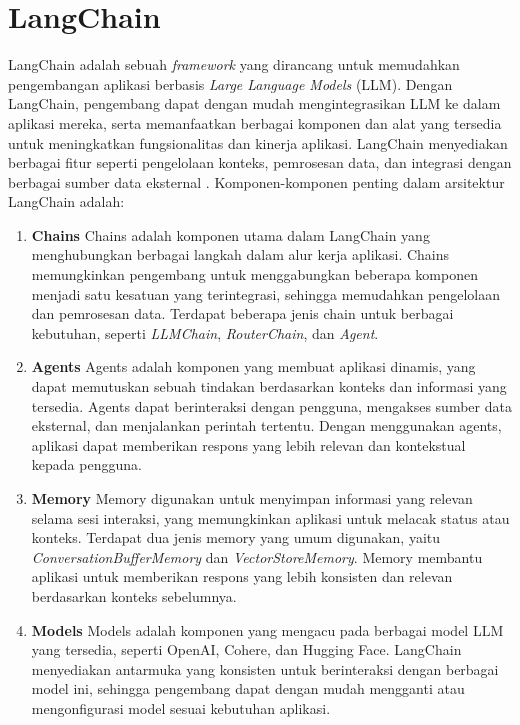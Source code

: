 \section{LangChain}
\label{sec:langchain}

LangChain adalah sebuah \textit{framework} yang dirancang untuk memudahkan pengembangan aplikasi berbasis \textit{Large Language Models} (LLM). Dengan LangChain, pengembang dapat dengan mudah mengintegrasikan LLM ke dalam aplikasi mereka, serta memanfaatkan berbagai komponen dan alat yang tersedia untuk meningkatkan fungsionalitas dan kinerja aplikasi. LangChain menyediakan berbagai fitur seperti pengelolaan konteks, pemrosesan data, dan integrasi dengan berbagai sumber data eksternal \parencite{IBM2023LangChain}. Komponen-komponen penting dalam arsitektur LangChain adalah:

\begin{enumerate}
  \item \textbf{Chains} \newline
  Chains adalah komponen utama dalam LangChain yang menghubungkan berbagai langkah dalam alur kerja aplikasi. Chains memungkinkan pengembang untuk menggabungkan beberapa komponen menjadi satu kesatuan yang terintegrasi, sehingga memudahkan pengelolaan dan pemrosesan data. Terdapat beberapa jenis chain untuk berbagai kebutuhan, seperti \textit{LLMChain}, \textit{RouterChain}, dan \textit{Agent}.

  \item \textbf{Agents} \newline
  Agents adalah komponen yang membuat aplikasi dinamis, yang dapat memutuskan sebuah tindakan berdasarkan konteks dan informasi yang tersedia. Agents dapat berinteraksi dengan pengguna, mengakses sumber data eksternal, dan menjalankan perintah tertentu. Dengan menggunakan agents, aplikasi dapat memberikan respons yang lebih relevan dan kontekstual kepada pengguna.

  \item \textbf{Memory} \newline
  Memory digunakan untuk menyimpan informasi yang relevan selama sesi interaksi, yang memungkinkan aplikasi untuk melacak status atau konteks. Terdapat dua jenis memory yang umum digunakan, yaitu \textit{ConversationBufferMemory} dan \textit{VectorStoreMemory}. Memory membantu aplikasi untuk memberikan respons yang lebih konsisten dan relevan berdasarkan konteks sebelumnya.

  \item \textbf{Models} \newline
  Models adalah komponen yang mengacu pada berbagai model LLM yang tersedia, seperti OpenAI, Cohere, dan Hugging Face. LangChain menyediakan antarmuka yang konsisten untuk berinteraksi dengan berbagai model ini, sehingga pengembang dapat dengan mudah mengganti atau mengonfigurasi model sesuai kebutuhan aplikasi.


\end{enumerate}
